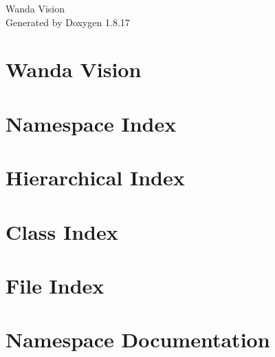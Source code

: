 \let\mypdfximage\pdfximage\def\pdfximage{\immediate\mypdfximage}\documentclass[twoside]{book}
\newcommand{\+}{\discretionary{\mbox{\scriptsize$\hookleftarrow$}}{}{}}
\newcommand{\clearemptydoublepage}{%
  \newpage{\pagestyle{empty}\cleardoublepage}%
}
\begin{document}
\hypersetup{pageanchor=false,
             bookmarksnumbered=true,
             pdfencoding=unicode
            }
\begin{titlepage}
\vspace*{7cm}
\begin{center}%
{\Large Wanda Vision }\\
\vspace*{1cm}
{\large Generated by Doxygen 1.8.17}\\
\end{center}
\end{titlepage}
\clearemptydoublepage
{}
\tableofcontents
\clearemptydoublepage
{}
\hypersetup{pageanchor=true}

\chapter{Wanda Vision}
\label{md_README}

\chapter{Namespace Index}

\chapter{Hierarchical Index}

\chapter{Class Index}

\chapter{File Index}

\chapter{Namespace Documentation}








\end{document}
